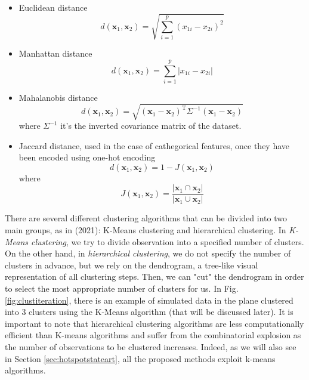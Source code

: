 \begin{itemize}
    \item Euclidean distance
\begin{equation}
    \label{eq:euclidean}
    d\left(\mathbf{x}_1,\mathbf{x}_2\right) = \sqrt{\sum_{i=1}^p\left(x_{1i}-x_{2i} \right)^2}
\end{equation}
\item Manhattan distance
\begin{equation}
    \label{eq:mandistance}
    d\left(\mathbf{x}_1,\mathbf{x}_2\right) = \sum_{i=1}^p\left|x_{1i}-x_{2i} \right|
\end{equation}
\item Mahalanobis distance
\begin{equation}
    \label{eq:mahadistance}
    d(\mathbf{x}_1, \mathbf{x}_2) = \sqrt{(\mathbf{x}_1 - \mathbf{x}_2)^\mathrm{T} \Sigma^{-1} (\mathbf{x}_1 - \mathbf{x}_2)}
\end{equation}
where $\Sigma^{-1}$ it's the inverted covariance matrix of the dataset.
\item Jaccard distance, used in the case of cathegorical features, once they have been encoded using one-hot encoding
\begin{equation}
    \label{eq:jaccard}
    d\left(\mathbf{x}_1, \mathbf{x}_2\right) = 1 - J\left(\mathbf{x}_1, \mathbf{x}_2\right)
\end{equation}
where 
\begin{equation}
J\left(\mathbf{x}_1, \mathbf{x}_2\right) = \frac{\left|\mathbf{x}_1 \cap \mathbf{x}_2\right|}{\left|\mathbf{x}_1 \cup \mathbf{x}_2\right|}    
\end{equation}
\end{itemize}
There are several different clustering algorithms that can be divided into two main groups, as in \citeauthor{james_introduction_2021} (2021): K-Means clustering and hierarchical clustering. In \emph{K-Means clustering}, we try to divide observation into a specified number of clusters. On the other hand, in \emph{hierarchical clustering}, we do not specify the number of clusters in advance, but we rely on the dendrogram, a tree-like visual representation of all clustering steps. Then, we can "cut" the dendrogram in order to select the most appropriate number of clusters for us. In Fig. \ref{fig:clustiteration}, there is an example of simulated data in the plane clustered into 3 clusters using the K-Means algorithm (that will be discussed later). It is important to note that hierarchical clustering algorithms are less computationally efficient than K-means algorithms and suffer from the combinatorial explosion as the number of observations to be clustered increases. Indeed, as we will also see in Section \ref{sec:hotspotstateart}, all the proposed methods exploit k-means algorithms.

